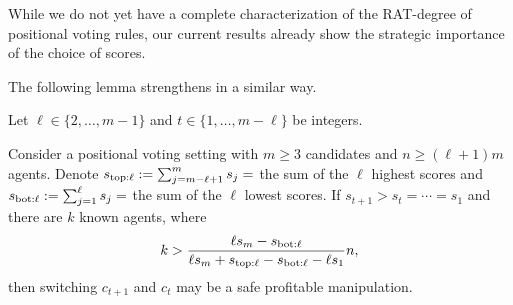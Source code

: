 While we do not yet have a complete characterization of the RAT-degree of positional voting rules, our current results already show the strategic importance of the choice of scores.


\iffalse
The following lemma strengthens 
in a similar way.
\begin{lemma}
\label{lem:z:st1>st}
Let $\ell \in \{2,\ldots, m-1\}$ 
and $t\in\{1,\ldots,m-\ell \}$ be integers.

Consider a positional voting setting with $m\geq 3$ candidates and $n\geq (\ell+1)m$ agents.
Denote $s_{\mathrm{top:}\ell} := \sum_{j=m-\ell+1}^m s_j = $  the sum of the $\ell$ highest scores and $s_{\mathrm{bot:}\ell} := \sum_{j=1}^{\ell}s_j = $ the sum of the $\ell$ lowest scores.
If $s_{t+1} > s_t = \cdots = s_1$ and there are $k$ known agents,
where 
\begin{align*}
k > \frac{\ell s_m - s_{\mathrm{bot:}\ell}}{\ell s_m + s_{\mathrm{top:}\ell} - s_{\mathrm{bot:}\ell} - \ell s_1} n,
\end{align*}
then switching $c_{t+1}$ and $c_t$ may be a safe profitable manipulation.
\end{lemma}


